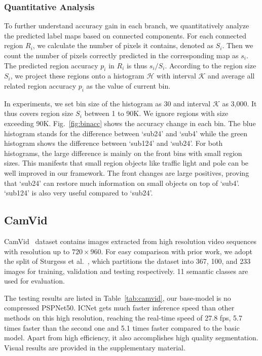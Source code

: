 \documentclass[runningheads]{llncs}
\begin{document}
\subsubsection{Quantitative Analysis}
To further understand accuracy gain in each branch, we quantitatively analyze the predicted label maps based on connected components. For each connected region $R_{i}$, we calculate the number of pixels it contains, denoted as $S_{i}$. Then we count the number of pixels correctly predicted in the corresponding map as $s_{i}$. The predicted region accuracy $p_{i}$ in $R_{i}$ is thus ${s_{i}}/{S_{i}}$. According to the region size $S_{i}$, we project these regions onto a histogram $\mathcal{H}$ with interval $\mathcal{K}$ and average all related region accuracy $p_{i}$ as the value of current bin.

In experiments, we set bin size of the histogram as 30 and interval $\mathcal{K}$ as 3,000. It thus covers region size $S_{i}$ between 1 to 90K. We ignore regions with size exceeding 90K. Fig.~\ref{fig:binacc} shows the accuracy change in each bin. The blue histogram stands for the difference between `sub24' and `sub4' while the green histogram shows the difference between `sub124' and `sub24'. For both histograms, the large difference is mainly on the front bins with small region sizes. This manifests that small region objects like traffic light and pole can be well improved in our framework. The front changes are large positives, proving that `sub24' can restore much information on small objects on top of `sub4'. `sub124' is also very useful compared to `sub24'.


\subsection{CamVid}
CamVid~\cite{BrostowFC09} dataset contains images extracted from high resolution video sequences with resolution up to $720 \times 960$. For easy comparison with prior work, we adopt the split of Sturgess et al.~\cite{sturgess2009combining}, which partitions the dataset into 367, 100, and 233 images for training, validation and testing respectively. 11 semantic classes are used for evaluation.

The testing results are listed in Table~\ref{tab:camvid}, our base-model is no compressed PSPNet50. ICNet gets much faster inference speed than other methods on this high resolution, reaching the real-time speed of 27.8 fps, 5.7 times faster than the second one and 5.1 times faster compared to the basic model. Apart from high efficiency, it also accomplishes high quality segmentation. Visual results are provided in the supplementary material.
\end{document}
